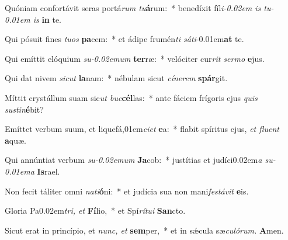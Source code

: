 \item Quóniam confortávit seras portá\textit{rum tu}\textbf{á}rum:~* benedíxit fíl\textit{i\kern -0.02em is tu\kern -0.01em is} \textbf{in} te.
\item Qui pósuit fines \textit{tuos} \textbf{pa}cem:~* et ádipe frumén\textit{ti sáti}\kern -0.01em\textbf{at} te.
\item Qui emíttit elóquium \textit{su\kern -0.02emum} \textbf{ter}ræ:~* velóciter cur\textit{rit sermo} \textbf{e}jus.
\item Qui dat nivem \textit{sicut} \textbf{la}nam:~* nébulam sicut \textit{cínerem} \textbf{spár}git.
\item Míttit crystállum suam sic\textit{ut buc}\textbf{cél}las:~* ante fáciem frígoris ejus \textit{quis sus\-tin}\textbf{é}bit?
\item Emíttet verbum suum, et liquefá,01em\textit{ciet} \textbf{e}a:~* flabit spíritus ejus, \textit{et fluent} \textbf{a}quæ.
\item Qui annúntiat verbum \textit{su\kern-0.02emum} \textbf{Ja}cob:~* justítias et judíci\kern 0.02em\textit{a su\kern -0.01ema} \textbf{Is}rael.
\item Non fecit táliter omni \textit{nati}\textbf{ó}ni:~* et judícia sua non mani\textit{festávit} \textbf{e}is.
\item Gloria Pa\kern 0.02em\textit{tri, et} \textbf{Fí}lio,~* et Spí\textit{rítui} \textbf{San}cto.
\item Sicut erat in princípio, et \textit{nunc, et} \textbf{sem}per,~* et in sǽcula sæ\hspace{0.03em}\textit{culórum.} \textbf{A}men.
